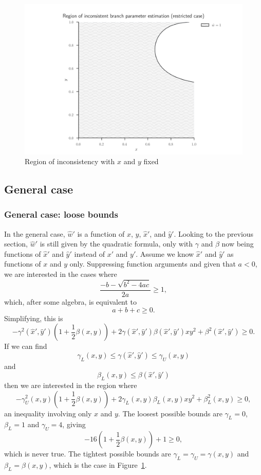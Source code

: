 \documentclass{article}
\begin{document}
\begin{figure}
\centering
\includegraphics[width=.9\textwidth]{branch-length-inconsistency-inkscape}
\caption{Region of inconsistency with $x$ and $y$ fixed}
\label{fig:bl-inconsistency}
\end{figure}

\subsection{General case}

\subsubsection{General case: loose bounds}

In the general case, $\hat{w}'$ is a function of $x$, $y$, $\hat{x}'$, and $\hat{y}'$.
Looking to the previous section, $\hat{w}'$ is still given by the quadratic formula, only with $\gamma$ and $\beta$ now being functions of $\hat{x}'$ and $\hat{y}'$ instead of $x'$ and $y'$.
Assume we know $\hat{x}'$ and $\hat{y}'$ as functions of $x$ and $y$ only.
Suppressing function arguments and given that $a < 0$, we are interested in the cases where
$$
\frac{-b - \sqrt{b^2 - 4ac}}{2a} \ge 1,
$$
which, after some algebra, is equivalent to
$$
a + b + c \ge 0.
$$
Simplifying, this is
$$
-\gamma^2(\hat{x}', \hat{y}')(1 + \frac{1}{2}\beta(x, y)) + 2\gamma(\hat{x}', \hat{y}')\beta(\hat{x}', \hat{y}')xy^2 + \beta^2(\hat{x}', \hat{y}') \ge 0.
$$
If we can find
$$
\gamma_{L}(x, y) \le \gamma(\hat{x}', \hat{y}') \le \gamma_{U}(x, y)
$$
and
$$
\beta_{L}(x, y) \le \beta(\hat{x}', \hat{y}')
$$
then we are interested in the region where
$$
-\gamma_{U}^2(x, y)(1 + \frac{1}{2}\beta(x, y)) + 2\gamma_{L}(x, y)\beta_{L}(x, y)xy^2 + \beta_{L}^2(x, y) \ge 0,
$$
an inequality involving only $x$ and $y$.
The loosest possible bounds are $\gamma_{L} = 0$, $\beta_{L} = 1$ and $\gamma_{U} = 4$, giving
$$
-16(1 + \frac{1}{2}\beta(x, y)) + 1 \ge 0,
$$
which is never true.
The tightest possible bounds are $\gamma_{L} = \gamma_{U} = \gamma(x, y)$ and $\beta_{L} = \beta(x, y)$, which is the case in Figure~\ref{fig:bl-inconsistency}.
\end{document}
